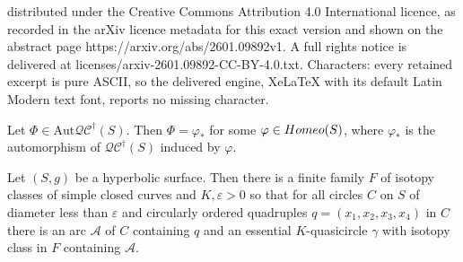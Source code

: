 \documentclass[10pt,a4paper]{amsart}
\newcommand{\Aut}{\mathrm{Aut}}
\begin{document}
distributed under the Creative Commons Attribution 4.0 International licence, as recorded in the arXiv licence metadata for this exact version and shown on the abstract page https://arxiv.org/abs/2601.09892v1. A full rights notice is delivered at licenses/arxiv-2601.09892-CC-BY-4.0.txt. Characters: every retained excerpt is pure ASCII, so the delivered engine, XeLaTeX with its default Latin Modern text font, reports no missing character.
\begin{proposition}\label{prop-auts-come-from-homeos}
    Let $\Phi\in \Aut\mathcal{QC}^{\dagger}(S)$. Then $\Phi = \varphi_{*}$ for some $\varphi \in {\rm{Homeo}}(S)$, where $\varphi_*$ is the automorphism of $\mathcal{QC}^\dagger(S)$ induced by $\varphi$.
\end{proposition}

\begin{lemma}\label{lemma-stick-arc-in-QC}
    Let $(S,g)$ be a hyperbolic surface.
    Then there is a finite family $F$ of isotopy classes of simple closed curves and $K, \varepsilon > 0$ so that for all circles $C$ on $S$ of diameter less than $\varepsilon$ and circularly ordered quadruples $q = (x_1, x_2, x_3,x_4) $ in $C$ there is an arc $\mathcal{A}$ of $C$ containing $q$ and an essential $K$-quasicircle $\gamma$ with isotopy class in $F$ containing $\mathcal{A}$.
\end{lemma}
\end{document}
